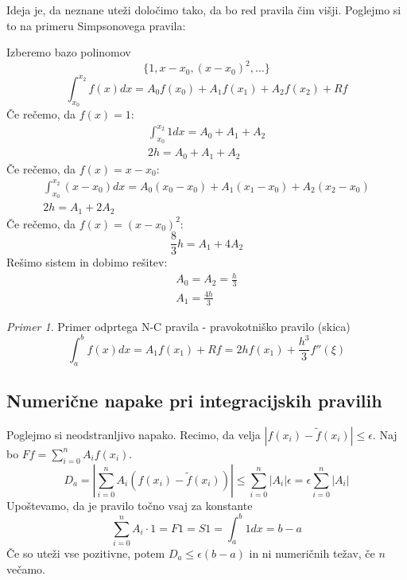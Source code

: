 \documentclass[a4paper,12pt]{article}
\theoremstyle{definition}
\theoremstyle{remark}
\newtheorem*{ex}{Primer}
\begin{document}
Ideja je, da neznane uteži določimo tako, da bo red pravila čim višji. Poglejmo si to na primeru Simpsonovega pravila:

Izberemo bazo polinomov
\begin{equation*}
    \{1, x-x_0, (x-x_0)^2, \dots\}
\end{equation*}
\begin{equation*}
    \int_{x_0}^{x_2}f(x) dx = A_0 f(x_0) + A_1 f(x_1) + A_2 f(x_2) + Rf
\end{equation*}
Če rečemo, da $f(x) = 1$:
\begin{gather*}
    \int_{x_0}^{x_2} 1 dx = A_0 + A_1 + A_2 \\
    2h =  A_0 + A_1 + A_2
\end{gather*}
Če rečemo, da $f(x) = x-x_0$:
\begin{gather*}
    \int_{x_0}^{x_2} (x-x_0) dx = A_0 (x_0-x_0) + A_1(x_1-x_0) + A_2(x_2-x_0) \\
    2h = A_1 + 2A_2
\end{gather*}
Če rečemo, da $f(x) = (x-x_0)^2$:
\begin{equation*}
    \frac{8}{3} h = A_1 + 4A_2
\end{equation*}
Rešimo sistem in dobimo rešitev:
\begin{gather*}
    A_0 = A_2 = \frac{h}{3}\\
    A_1 = \frac{4h}{3}
\end{gather*}

\begin{ex}
    Primer odprtega N-C pravila - pravokotniško pravilo (skica)
    \begin{equation*}
        \int_{a}^{b} f(x) dx = A_1 f(x_1) + Rf = 2hf(x_1) + \frac{h^3}{3} f''(\xi)
    \end{equation*}
\end{ex}

\subsection{Numerične napake pri integracijskih pravilih}
Poglejmo si neodstranljivo napako. Recimo, da velja $|f(x_i) - \tilde{f}(x_i)| \leq \epsilon$. Naj bo $F f = \sum_{i = 0}^{n} A_i f(x_i)$.
\begin{equation*}
    D_a = \left|\sum_{i=0}^{n} A_i (f(x_i) - \tilde{f}(x_i)) \right| \leq \sum_{i=0}^{n} \left|A_i \right| \epsilon = \epsilon \sum_{i=0}^{n} \left|A_i\right|
\end{equation*}
Upoštevamo, da je pravilo točno vsaj za konstante
\begin{equation*}
    \sum_{i=0}^{n} A_i \cdot 1 = F1 = S1 = \int_{a}^{b} 1dx = b-a
\end{equation*}
Če so uteži vse pozitivne, potem $D_a \leq \epsilon(b-a)$ in ni numeričnih težav, če $n$ večamo.
\end{document}
